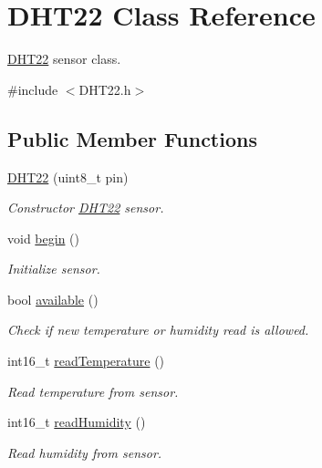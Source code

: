 \hypertarget{class_d_h_t22}{}\section{D\+H\+T22 Class Reference}
\label{class_d_h_t22}


\hyperlink{class_d_h_t22}{D\+H\+T22} sensor class.  




{\ttfamily \#include $<$D\+H\+T22.\+h$>$}

\subsection*{Public Member Functions}
\begin{DoxyCompactItemize}
\item 
\hyperlink{class_d_h_t22_a6983635331e939d679888b4a936e0f53}{D\+H\+T22} (uint8\+\_\+t pin)
\begin{DoxyCompactList}\small\item\em Constructor \hyperlink{class_d_h_t22}{D\+H\+T22} sensor. \end{DoxyCompactList}\item 
void \hyperlink{class_d_h_t22_a1391c4ada47bb35408a45d349747be5c}{begin} ()
\begin{DoxyCompactList}\small\item\em Initialize sensor. \end{DoxyCompactList}\item 
bool \hyperlink{class_d_h_t22_a70b4c57d73f985e715bd523f15ccae25}{available} ()
\begin{DoxyCompactList}\small\item\em Check if new temperature or humidity read is allowed. \end{DoxyCompactList}\item 
int16\+\_\+t \hyperlink{class_d_h_t22_aeed4f98e419ffb07d3e4c09ebc10162c}{read\+Temperature} ()
\begin{DoxyCompactList}\small\item\em Read temperature from sensor. \end{DoxyCompactList}\item 
int16\+\_\+t \hyperlink{class_d_h_t22_a4ff2d9fac4b8ecf1d72f71bb861c8dcf}{read\+Humidity} ()
\begin{DoxyCompactList}\small\item\em Read humidity from sensor. \end{DoxyCompactList}\end{DoxyCompactItemize}


